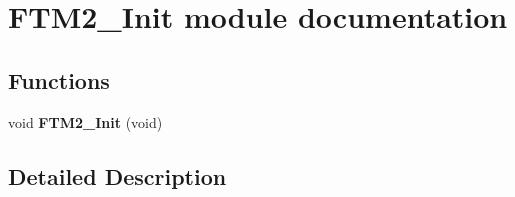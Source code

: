 \hypertarget{group___f_t_m2___init__module}{}\section{F\+T\+M2\+\_\+\+Init module documentation}
\label{group___f_t_m2___init__module}
\subsection*{Functions}
\begin{DoxyCompactItemize}
\item 
void {\bfseries F\+T\+M2\+\_\+\+Init} (void)\hypertarget{group___f_t_m2___init__module_ga22ea3d6dcea6da60bedc871e68f68466}{}\label{group___f_t_m2___init__module_ga22ea3d6dcea6da60bedc871e68f68466}

\end{DoxyCompactItemize}


\subsection{Detailed Description}

